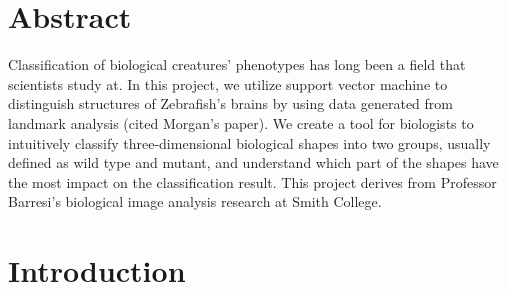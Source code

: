 \documentclass[10pt,letterpaper]{article}
\date{}
\newcommand{\getIndex}[2]{
  \ForEach{,}{\IfEq{#1}{\thislevelitem}{\number\thislevelcount\ExitForEach}{}}{#2}
}
\newcommand{\getAff}[1]{
  \getIndex{#1}{Smith College}
}
\begin{document}
\vspace*{0.2in}

\section*{Abstract}
Classification of biological creatures' phenotypes has long been a field
that scientists study at. In this project, we utilize support vector
machine to distinguish structures of Zebrafish's brains by using data
generated from landmark analysis (cited Morgan's paper). We create a
tool for biologists to intuitively classify three-dimensional biological
shapes into two groups, usually defined as wild type and mutant, and
understand which part of the shapes have the most impact on the
classification result. This project derives from Professor Barresi's
biological image analysis research at Smith College.


\linenumbers

\newpage

\section{Introduction}\label{introduction}
\end{document}
